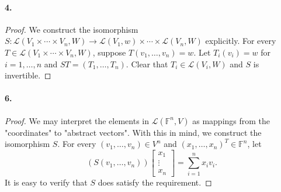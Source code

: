   \paragraph{4.}
  \begin{proof}
    We construct the isomorphism $S:\mathcal{L}(V_1\times\cdots\times V_n,W)\to
    \mathcal{L}(V_1,w)\times\cdots\times\mathcal{L}(V_n,W)$ explicitly. For 
    every $T\in\mathcal{L}(V_1\times\cdots\times V_n,W)$, suppose $T(v_1,\dots,
    v_n) = w$. Let $T_i(v_i)=w$ for $i=1,\dots,n$ and $ST = (T_1,\dots, T_n)$.
    Clear that $T_i\in\mathcal{L}(V_i, W)$ and $S$ is invertible.
  \end{proof}

  \paragraph{6.}
  \begin{proof}
    We may interpret the elements in $\mathcal{L}(\mathbb{F}^n,V)$ as mappings
    from the "coordinates" to "abstract vectors". With this in mind, we 
    construct the isomorphism $S$. For every $(v_1,\dots,v_n)\in V^n$ and $(x_1,
    \dots,x_n)^T\in\mathbb{F}^n$, let 
    \[
      (S(v_1,\dots,v_n))
      \begin{bmatrix}
        x_1 \\ \vdots \\ x_n
      \end{bmatrix}
      = \sum_{i=1}^n x_iv_i.
    \]
    It is easy to verify that $S$ does satisfy the requirement.
  \end{proof}

